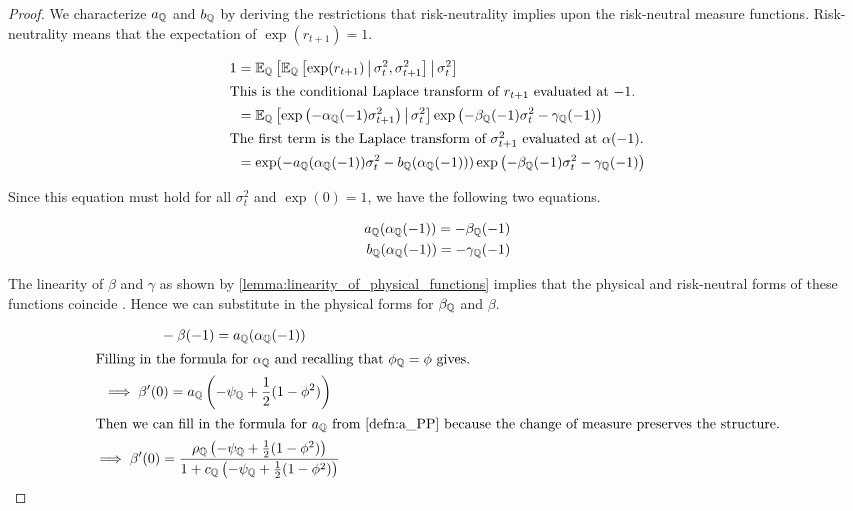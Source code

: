 \documentclass[11pt, letterpaper, twoside, final]{article}
\begin{document}
\begin{appendices}
\begin{proof}
We characterize $a_{\mathbb{Q}}$ and $b_{\mathbb{Q}}$ by deriving the restrictions that risk-neutrality implies upon the
risk-neutral measure functions.
Risk-neutrality means that the expectation of $\exp(r_{t+1}) = 1$.

\begin{align}
    1 &= \E_{\QQ}\left[\E_{\QQ}\left[\exp(r_{t+1}) \mvert \sigma_t^2, \sigma^2_{t+1}\right]  \mvert \sigma^2_t
        \right] \\
%
    \intertext{This is the conditional Laplace transform of $r_{t+1}$ evaluated at $-1$.}
%
      \label{eqn:risk_neutral_at_neg_1}
    &= \E_{\QQ}\left[ \exp\left(-\alpha_{\QQ}(-1) \sigma^2_{t+1}\right)  \mvert \sigma^2_t \right]
       \exp\left(-\beta_{\QQ}(-1) \sigma^2_t - \gamma_{\QQ}(-1)\right)   \\
%
    \intertext{The first term is the Laplace transform of $\sigma^2_{t+1}$ evaluated at $\alpha(-1)$.}
%
      &= \exp(-a_{\QQ}(\alpha_{\QQ}(-1)) \sigma^2_t - b_{\QQ}(\alpha_{\QQ}(-1))) \exp\left(-\beta_{\QQ}(-1)
         \sigma^2_t - \gamma_{\QQ}(-1)\right)  
\end{align}

Since this equation must hold for all $\sigma_t^2$ and $\exp(0) = 1$, we have the following two equations.

\begin{align}
    a_{\mathbb{Q}}(\alpha_{\mathbb{Q}}(-1)) = - \beta_{\mathbb{Q}}(-1) \\
    b_{\mathbb{Q}}(\alpha_{\mathbb{Q}}(-1)) = - \gamma_{\mathbb{Q}}(-1) 
\end{align}


The linearity of $\beta$ and $\gamma$ as shown by \cref{lemma:linearity_of_physical_functions} implies that the
physical and risk-neutral forms of these functions coincide \textcite[Proposition 5]{khrapov2016affine}. 
Hence we can substitute in the physical forms for $\beta_{\mathbb{Q}}$ and $\beta$.

\begin{gather}
    \label{eqn:beta_qq_at_minus_one}
    \phantom{\implies}   - \beta(-1) = a_{\QQ}(\alpha_{\QQ}(-1))\\
%
    \intertext{Filling in the formula for $\alpha_{\QQ}$ and recalling that $\phi_{\QQ} = \phi$ gives.}
%
    \implies \beta'(0) = a_{\QQ}\left(-\psi_{\QQ} + \frac{1}{2} (1- \phi^2)\right)  \\
%
    \intertext{Then we can fill in the formula for $a_{\QQ}$ from \cref{defn:a_PP} because the change of measure
    preserves the structure.}
%
    \implies \beta'(0) = \frac{\rho_{\QQ} \left(-\psi_{\QQ} + \frac{1}{2} (1- \phi^2)\right)}{1 + c_{\QQ}
    \left(-\psi_{\QQ} + \frac{1}{2} (1- \phi^2)\right)} 
    \label{eqn:beta_function_QQ}
\end{gather}


\end{proof}
\end{appendices}
\end{document}
